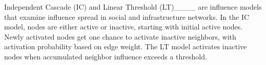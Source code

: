 Independent Cascade (IC) and Linear Threshold (LT)____ are influence models that examine influence spread in social and infrastructure networks. In the IC model, nodes are either active or inactive, starting with initial active nodes. Newly activated nodes get one chance to activate inactive neighbors, with activation probability based on edge weight. The LT model activates inactive nodes when accumulated neighbor influence exceeds a threshold.

